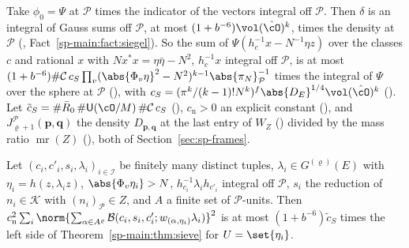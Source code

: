Take $\phi_0=\Psi$ at $\mathcal P$ times the indicator of the vectors integral off $\mathcal P$. Then $\delta$ is
an integral of Gauss sums off $\mathcal P$, at most $(1+b^{-6})\vol(\hat\cO)^k$, times the density at
$\mathcal P$ (, Fact~\ref{sp-main:fact:siegel}). So the sum of $\Psi(h_c^{-1}x-N^{-1}\eta z)$ over the
classes $c$ and rational $x$ with $Nx^*x=\eta\bar\eta-N^2$, $h_c^{-1}x$ integral off $\mathcal P$, is at most $(1+b^{-6})\#\mathcal C\,c_S
\prod_v(\abs{\Phi_v\eta}^2-N^2)^{k-1}\abs{\pi_N}_{\mathcal P}^{-1}$ times the integral of $\Psi$ over the
sphere at $\mathcal P$ (), with
$c_S=(\pi^k/(k-1)!N^k)^f\abs{D_E}^{1/4}\vol(\hat\cO)^k$ (). Let
$\tilde c_S=\#\bar R_0\,\#\mathsf U(\cO/M)\,\#\mathcal C\,c_S$ (),
$c_{\mathrm n}>0$ an explicit constant (), and
$J^{\mathcal P}_{\varrho+1}(\mathbf p,\mathbf q)$ the density $D_{\mathbf p,\mathbf q}$ at the last entry of $W_Z$
() divided by the mass ratio $\operatorname{mr}(Z)$
(), both of Section~\ref{sec:sp-frames}.

\begin{proposition}
\label{sp-main:prop:siegel}
Let $(c_i,c'_i,s_i,\lambda_i)_{i\in\mathcal I}$ be finitely many distinct tuples, $\lambda_i\in
G^{(\varrho)}(E)$ with $\eta_i=h(z,\lambda_iz)$, $\abs{\Phi_v\eta_i}>N$, $h_{c_i}^{-1}\lambda_ih_{c'_i}$ integral
off $\mathcal P$, $s_i$ the reduction of $n_i\in\mathcal K$ with $(n_i)_{\mathcal P}\in Z$, and $A$ a finite set of
$\mathcal P$-units. Then $c_{\mathrm n}^2\sum_i\norm{\sum_{\alpha\in A^\varrho}\mathcal B(c_i,s_i,c'_i;
w_{(\alpha,\eta_i)}\lambda_i)}^2$ is at most $(1+b^{-6})\tilde c_S$ times the left side of
Theorem~\ref{sp-main:thm:sieve} for $U=\set{\eta_i}$.
\end{proposition}

